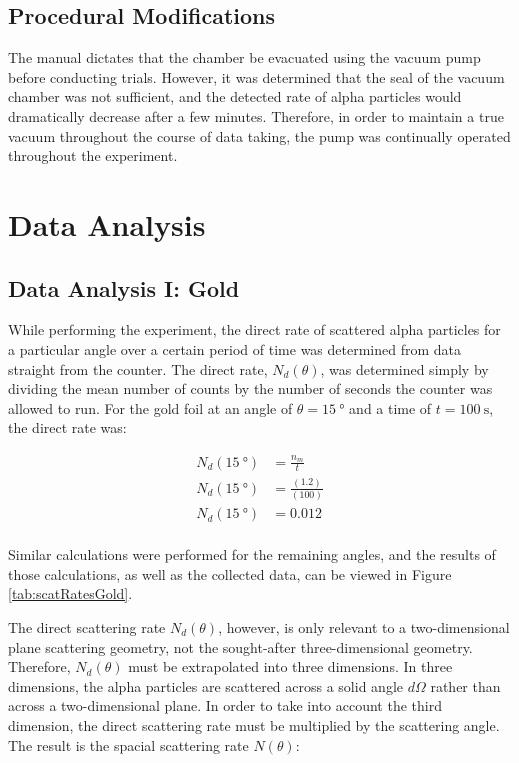 \documentclass[a4paper]{article}
\begin{document}
\subsection{Procedural Modifications}
\qq The manual dictates that the chamber be evacuated using the vacuum pump
before conducting trials. However, it was determined that the seal of the vacuum
chamber was not sufficient, and the detected rate of alpha particles would
dramatically decrease after a few minutes. Therefore, in order to maintain a
true vacuum throughout the course of data taking, the pump was continually
operated throughout the experiment.  \qq

\section{Data Analysis}

\subsection{Data Analysis I: Gold}

\qq While performing the experiment, the direct rate of scattered alpha
particles for a particular angle over a certain period of time was determined
from data straight from the counter. The direct rate, \( N_d (\theta) \), was
determined simply by dividing the mean number of counts by the number of seconds
the counter was allowed to run. For the gold foil at an angle of
\( \theta = \SI{15}{\degree} \) and a time of \( t = \SI{100}{\second} \), the
direct rate was:

\begin{align*}
  N_d (\SI{15}{\degree}) &= \frac{n_m}{t} \\
  N_d (\SI{15}{\degree}) &= \frac{(1.2)}{(100)} \\
  N_d (\SI{15}{\degree}) &= \num{0.012} \\
\end{align*}

Similar calculations were performed for the remaining angles, and the results of
those calculations, as well as the collected data, can be viewed in Figure
\ref{tab:scatRatesGold}.

\qq The direct scattering rate \( N_d (\theta) \), however, is only relevant to
a two-dimensional plane scattering geometry, not the sought-after
three-dimensional geometry. Therefore, \( N_d (\theta) \) must be extrapolated
into three dimensions. In three dimensions, the alpha particles are scattered
across a solid angle \( d\Omega \) rather than across a two-dimensional
plane. In order to take into account the third dimension, the direct scattering
rate must be multiplied by the scattering angle. The result is the spacial
scattering rate \( N (\theta) \):
\end{document}
